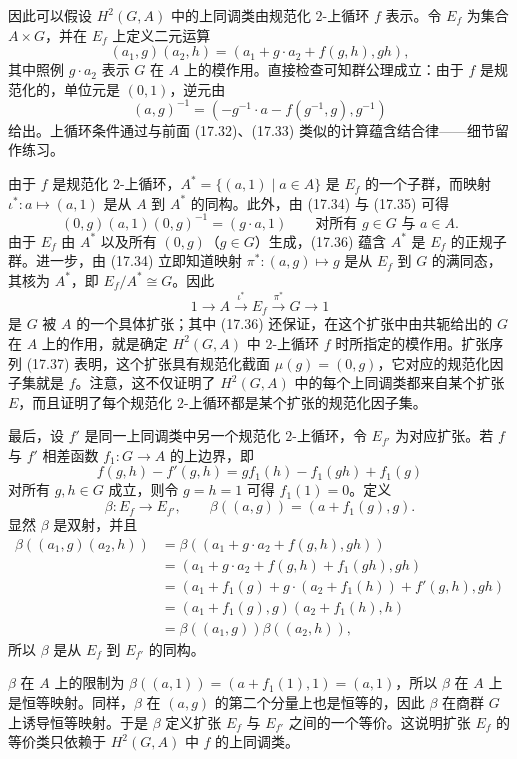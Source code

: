 因此可以假设 $H^2(G,A)$ 中的上同调类由规范化 $2$-上循环 $f$ 表示。令 $E_f$ 为集合 $A\times G$，并在 $E_f$ 上定义二元运算
\[
  (a_1,g)(a_2,h)=(a_1+g\cdot a_2+f(g,h),gh),
  \tag{17.34}
\]
其中照例 $g\cdot a_2$ 表示 $G$ 在 $A$ 上的模作用。直接检查可知群公理成立：由于 $f$ 是规范化的，单位元是 $(0,1)$，逆元由
\[
  (a,g)^{-1}=(-g^{-1}\cdot a-f(g^{-1},g),g^{-1})
  \tag{17.35}
\]
给出。上循环条件通过与前面 (17.32)、(17.33) 类似的计算蕴含结合律——细节留作练习。

由于 $f$ 是规范化 $2$-上循环，$A^*=\{(a,1)\mid a\in A\}$ 是 $E_f$ 的一个子群，而映射 $\iota^*:a\mapsto(a,1)$ 是从 $A$ 到 $A^*$ 的同构。此外，由 (17.34) 与 (17.35) 可得
\[
  (0,g)(a,1)(0,g)^{-1}=(g\cdot a,1)
  \qquad\text{对所有 }g\in G\text{ 与 }a\in A.
  \tag{17.36}
\]
由于 $E_f$ 由 $A^*$ 以及所有 $(0,g)$（$g\in G$）生成，(17.36) 蕴含 $A^*$ 是 $E_f$ 的正规子群。进一步，由 (17.34) 立即知道映射 $\pi^*:(a,g)\mapsto g$ 是从 $E_f$ 到 $G$ 的满同态，其核为 $A^*$，即 $E_f/A^*\cong G$。因此
\[
  1\to A\xrightarrow{\iota^*}E_f\xrightarrow{\pi^*}G\to1
  \tag{17.37}
\]
是 $G$ 被 $A$ 的一个具体扩张；其中 (17.36) 还保证，在这个扩张中由共轭给出的 $G$ 在 $A$ 上的作用，就是确定 $H^2(G,A)$ 中 $2$-上循环 $f$ 时所指定的模作用。扩张序列 (17.37) 表明，这个扩张具有规范化截面 $\mu(g)=(0,g)$，它对应的规范化因子集就是 $f$。注意，这不仅证明了 $H^2(G,A)$ 中的每个上同调类都来自某个扩张 $E$，而且证明了每个规范化 $2$-上循环都是某个扩张的规范化因子集。

最后，设 $f'$ 是同一上同调类中另一个规范化 $2$-上循环，令 $E_{f'}$ 为对应扩张。若 $f$ 与 $f'$ 相差函数 $f_1:G\to A$ 的上边界，即
\[
  f(g,h)-f'(g,h)=g f_1(h)-f_1(gh)+f_1(g)
\]
对所有 $g,h\in G$ 成立，则令 $g=h=1$ 可得 $f_1(1)=0$。定义
\[
  \beta:E_f\to E_{f'},\qquad \beta((a,g))=(a+f_1(g),g).
\]
显然 $\beta$ 是双射，并且
\[
\begin{aligned}
  \beta((a_1,g)(a_2,h))
  &=\beta((a_1+g\cdot a_2+f(g,h),gh))\\
  &=(a_1+g\cdot a_2+f(g,h)+f_1(gh),gh)\\
  &=(a_1+f_1(g)+g\cdot(a_2+f_1(h))+f'(g,h),gh)\\
  &=(a_1+f_1(g),g)(a_2+f_1(h),h)\\
  &=\beta((a_1,g))\beta((a_2,h)),
\end{aligned}
\]
所以 $\beta$ 是从 $E_f$ 到 $E_{f'}$ 的同构。

$\beta$ 在 $A$ 上的限制为 $\beta((a,1))=(a+f_1(1),1)=(a,1)$，所以 $\beta$ 在 $A$ 上是恒等映射。同样，$\beta$ 在 $(a,g)$ 的第二个分量上也是恒等的，因此 $\beta$ 在商群 $G$ 上诱导恒等映射。于是 $\beta$ 定义扩张 $E_f$ 与 $E_{f'}$ 之间的一个等价。这说明扩张 $E_f$ 的等价类只依赖于 $H^2(G,A)$ 中 $f$ 的上同调类。

